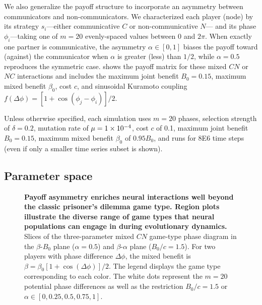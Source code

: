 \documentclass[pdflatex,twocolumn,sn-nature,super]{sn-jnl}
\begin{document}
We also generalize the payoff structure to incorporate
an asymmetry between communicators and non-communicators.
We characterized each player (node) by its
strategy $s_i$---either communicative $C$ or non-communicative $N$---
and its phase $\phi_i$---taking one of $m = \num{20}$ evenly-spaced values
between $0$ and $2 \pi$.
When exactly one partner is communicative, the
asymmetry $\alpha \in [0,1]$ biases the payoff toward (against)
the communicator when $\alpha$ is greater (less) than $1/2$,
while $\alpha = 0.5$ reproduces the symmetric case.
 shows the payoff matrix
for these mixed $CN$ or $NC$ interactions
and includes the maximum joint benefit $B_0 = 0.15$,
maximum mixed benefit $\beta_0$, cost $c$,
and sinusoidal Kuramoto coupling
$f(\Delta \phi) = [1+\cos(\phi_j - \phi_i)]/2$.

Unless otherwise specified,
each simulation uses
$m = 20$ phases,
selection strength of $\delta=0.2$,
mutation rate of $\mu=\num{1E-4}$,
cost $c$ of \num{0.1},
maximum joint benefit $B_0 = 0.15$,
maximum mixed benefit $\beta_0$ of $\num{0.95} B_0$,
and runs for \num{8E6} time steps
(even if only a smaller time series subset is shown).

\subsection{Parameter space}
\begin{figure*}
  \centering
  \begin{subcaptiongroup}
      {\label{fig:phase-diagram-beta_alpha}\captiontext*{}}{%
      {\label{fig:phase-diagram-beta_B}\captiontext*{}}{%
    {}%
  }}
  \end{subcaptiongroup}
  \caption{
    \textbf{
      Payoff asymmetry enriches neural interactions
      well beyond the classic prisoner's dilemma game type.
      Region plots illustrate the diverse range
      of game types that neural populations can engage in
      during evolutionary dynamics.
    }
    Slices of the three-parameter mixed $CN$ game-type phase diagram
    in the
    $\beta$-$B_0$ plane ($\alpha = 0.5$)
    and
    $\beta$-$\alpha$ plane ($B_0/c = 1.5$).
    For two players with phase difference $\Delta \phi$,
    the mixed benefit is
    $\beta = \beta_0 [1 + \cos(\Delta \phi)]/2$.
    The legend displays the game type corresponding to each color.
    The white dots represent the $m=20$ potential phase differences
    as well as the restriction
    $B_0/c = 1.5$
    or
    $\alpha \in [0,0.25,0.5,0.75,1]$.
  }\label{fig:phase-diagram}
\end{figure*}
\end{document}
